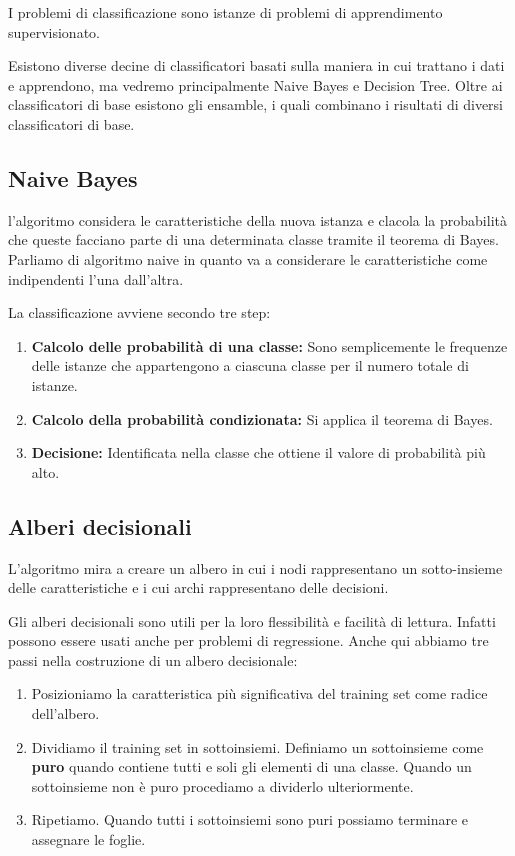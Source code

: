     I problemi di classificazione sono istanze di problemi di apprendimento supervisionato.
    
    Esistono diverse decine di classificatori basati sulla maniera in cui trattano i dati e apprendono, ma vedremo principalmente Naive Bayes e Decision Tree. Oltre ai classificatori di base esistono gli ensamble, i quali combinano i risultati di diversi classificatori di base.
    
    \subsection{Naive Bayes}
        l'algoritmo considera le caratteristiche della nuova istanza e clacola la probabilità che queste facciano parte di una determinata classe tramite il teorema di Bayes. Parliamo di algoritmo naive in quanto va a considerare le caratteristiche come indipendenti l'una dall'altra.
        
        La classificazione avviene secondo tre step:
        \begin{enumerate}
            \item \textbf{Calcolo delle probabilità di una classe:} Sono semplicemente le frequenze delle istanze che appartengono a ciascuna classe per il numero totale di istanze.
            
            \item \textbf{Calcolo della probabilità condizionata:} Si applica il teorema di Bayes.
            
            \item \textbf{Decisione:} Identificata nella classe che ottiene il valore di probabilità più alto.
        \end{enumerate}
        
    \subsection{Alberi decisionali}
        L'algoritmo mira a creare un albero in cui i nodi rappresentano un sotto-insieme delle caratteristiche e i cui archi rappresentano delle decisioni.
        
        Gli alberi decisionali sono utili per la loro flessibilità e facilità di lettura. Infatti possono essere usati anche per problemi di regressione. Anche qui abbiamo tre passi nella costruzione di un albero decisionale:
        \begin{enumerate}
            \item Posizioniamo la caratteristica più significativa del training set come radice dell'albero.
            
            \item Dividiamo il training set in sottoinsiemi. Definiamo un sottoinsieme come \textbf{puro} quando contiene tutti e soli gli elementi di una classe. Quando un sottoinsieme non è puro procediamo a dividerlo ulteriormente.
            
            \item Ripetiamo. Quando tutti i sottoinsiemi sono puri possiamo terminare e assegnare le foglie.
        \end{enumerate}
        
